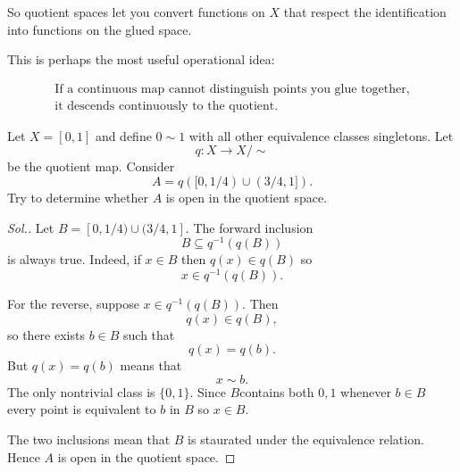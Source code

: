 \documentclass[11pt]{article}
\begin{document}
So quotient spaces let you convert functions on $X$ 
that respect the identification into functions 
on the glued space. 

This is perhaps the most useful operational idea: 

\begin{align*}
    \text{If a continuous map cannot distinguish points 
    you glue together,} \\  
    \text{it descends continuously 
    to the quotient}. 
\end{align*}

\begin{prob}
    Let $X = [0,1]$ and define $0 \sim 1$ with 
    all other equivalence classes singletons. 
    Let 
    \[
        q : X \to X/\sim
    \]
    be the quotient map. 
    Consider 
    \[
        A = q([0,1/4) \cup (3/4,1]). 
    \]
    Try to determine whether $A$ is open 
    in the quotient space. 
\end{prob}

\begin{proof}[Sol.]
    Let $B = [0,1/4) \cup (3/4, 1]$. The forward inclusion 
    \[
        B \subseteq q^{-1}(q(B)) 
    \]
    is always true. Indeed, if $x \in B$ then $q(x) \in q(B)$ 
    so 
    \[
        x \in q^{-1}(q(B)).
    \]

    For the reverse, suppose $x \in q^{-1}(q(B))$. 
    Then 
    \[
        q(x) \in q(B), 
    \]
    so there exists $b \in B$ such that 
    \[
        q(x) = q(b). 
    \]
    But $q(x) = q(b)$ means that 
    \[
        x \sim b. 
    \]
    The only nontrivial class is $\{0,1\}$. 
    Since $B$contains both $0,1$ whenever 
    $b \in B$ every point is equivalent to $b$ in $B$ 
    so $x \in B$. 
    
    The two inclusions
    mean that $B$ is staurated under the equivalence 
    relation. Hence $A$ is open in the 
    quotient space. 
\end{proof}
\end{document}
